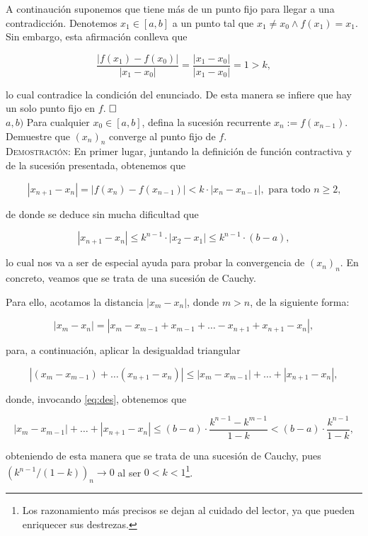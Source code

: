 \documentclass{article}
\begin{document}
A continaución suponemos que tiene más de un punto fijo para llegar a una contradicción. Denotemos $x_1 \in [a, b]$ a un punto tal que $x_1 \neq x_0 \land f(x_1) = x_1$. Sin embargo, esta afirmación conlleva que

\[\frac{|f(x_1) - f(x_0)|}{|x_1 - x_0|} = \frac{|x_1 - x_0|}{|x_1 - x_0|} = 1 > k,\]

lo cual contradice la condición del enunciado. De esta manera se infiere que hay un solo punto fijo en $f$. $\hfill\square$ \\

$a, b)$ Para cualquier $x_0 \in [a, b]$, defina la sucesión recurrente $x_n := f(x_{n - 1})$. Demuestre que $(x_n)_n$ converge al punto fijo de $f$. \\

\noindent\textsc{Demostración}: En primer lugar, juntando la definición de función contractiva y de la sucesión presentada, obtenemos que

\[|x_{n+1} - x_n| = |f(x_n) - f(x_{n-1})| < k \cdot |x_n - x_{n-1}|, \text{ para todo $n \geq 2$,}\]

\noindent de donde se deduce sin mucha dificultad que 

\begin{equation}
    |x_{n+1} - x_n| \leq k^{n-1} \cdot |x_2 - x_1| \leq k^{n-1} \cdot (b - a),
    \label{eq:des}
\end{equation}

\noindent lo cual nos va a ser de especial ayuda para probar la convergencia de $(x_n)_n$. En concreto, veamos que se trata de una sucesión de Cauchy.

Para ello, acotamos la distancia $|x_m - x_n|$, donde $m > n$, de la siguiente forma:

\[|x_m - x_n| = |x_m - x_{m-1} + x_{m-1} + \dots - x_{n+1} + x_{n+1} - x_n|,\]

\noindent para, a continuación, aplicar la desigualdad triangular

\[|(x_m - x_{m-1}) + \dots (x_{n+1} - x_n)| \leq |x_m - x_{m-1}| + \dots + |x_{n+1} - x_n|,\]

\noindent donde, invocando \eqref{eq:des}, obtenemos que

\[|x_m - x_{m-1}| + \dots + |x_{n+1} - x_n| \leq (b - a) \cdot \frac{k^{n-1} - k^{m-1}}{1 - k} < (b - a) \cdot \frac{k^{n-1}}{1 - k},\]

\noindent obteniendo de esta manera que se trata de una sucesión de Cauchy, pues $(k^{n-1}/(1-k))_n \longrightarrow 0$ al ser $0 < k < 1$\footnote{Los razonamiento más precisos se dejan al cuidado del lector, ya que pueden enriquecer sus destrezas.}.
\end{document}
